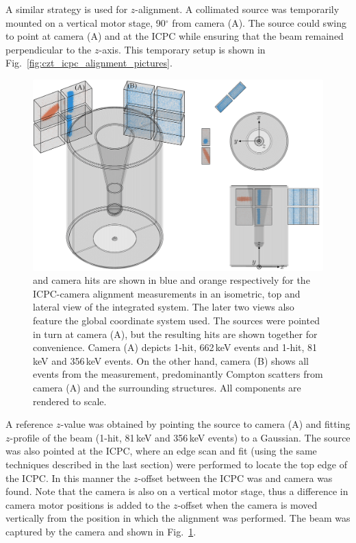 A similar strategy is used for $z$-alignment. A collimated \BaS{} source was temporarily mounted on a vertical motor stage, 90$^\circ$ from camera (A). The source could swing to point at camera (A) and at the ICPC while ensuring that the beam remained perpendicular to the $z$-axis. This temporary setup is shown in Fig.~\ref{fig:czt_icpc_alignment_pictures}. 
\begin{figure}[htb]
    \centering
    \includegraphics[width=6in]{figs/integration/czt_icpc_alignment_labeled_rq.png}
    \caption{\CsS{} and \BaS{} camera hits are shown in blue and orange respectively for the ICPC-camera alignment measurements in an isometric, top and lateral view of the integrated system. The later two views also feature the global coordinate system used. The sources were pointed in turn at camera (A), but the resulting hits are shown together for convenience. Camera (A) depicts \CsS{} 1-hit, 662\,keV events and \BaS{} 1-hit, 81\,keV and 356\,keV events. On the other hand, camera (B) shows all events from the \CsS{} measurement, predominantly Compton scatters from camera (A) and the surrounding structures. All components are rendered to scale.}  
    \label{fig:czt_icpc_alignment}
\end{figure}

A reference $z$-value was obtained by pointing the \BaS{} source to camera (A) and fitting $z$-profile of the beam (1-hit, 81\,keV and 356\,keV events) to a Gaussian. The \BaS{} source was also pointed at the ICPC, where an edge scan and fit (using the same techniques described in the last section) were performed to locate the top edge of the ICPC. In this manner the $z$-offset between the ICPC was and camera was found. Note that the camera is also on a vertical motor stage, thus a difference in camera motor positions is added to the $z$-offset when the camera is moved vertically from the position in which the alignment was performed. The \BaS{} beam was captured by the camera and shown in Fig.~\ref{fig:czt_icpc_alignment}.

